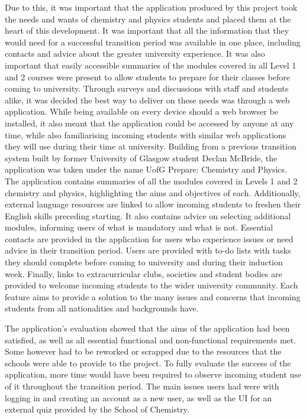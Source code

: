 \documentclass{l4proj}
\begin{document}
Due to this,  it was important that the application produced by this project took the needs and wants of chemistry and physics students and placed them at the heart of this development. It was important that all the information that they would need for a successful transition period was available in one place,  including contacts and advice about the greater university experience. It was also important that easily accessible summaries of the modules covered in all Level 1 and 2 courses were present to allow students to prepare for their classes before coming to university. Through surveys and discussions with staff and students alike,  it was decided the best way to deliver on these needs was through a web application. While being available on every device should a web browser be installed,  it also meant that the application could be accessed by anyone at any time,  while also familiarising incoming students with similar web applications they will use during their time at university. Building from a previous transition system built by former University of Glasgow student Declan McBride,  the application was taken under the name UofG Prepare: Chemistry and Physics. The application contains summaries of all the modules covered in Levels 1 and 2 chemistry and physics,  highlighting the aims and objectives of each. Additionally,  external language resources are linked to allow incoming students to freshen their English skills preceding starting. It also contains advice on selecting additional modules,  informing users of what is mandatory and what is not. Essential contacts are provided in the application for users who experience issues or need advice in their transition period. Users are provided with to-do lists with tasks they should complete before coming to university and during their induction week. Finally,  links to extracurricular clubs,  societies and student bodies are provided to welcome incoming students to the wider university community. Each feature aims to provide a solution to the many issues and concerns that incoming students from all nationalities and backgrounds have.

The application's evaluation showed that the aims of the application had been satisfied,  as well as all essential functional and non-functional requirements met. Some however had to be reworked or scrapped due to the resources that the schools were able to provide to the project. To fully evaluate the success of the application,  more time would have been required to observe incoming student use of it throughout the transition period. The main issues users had were with logging in and creating an account as a new user,  as well as the UI for an external quiz provided by the School of Chemistry.
\end{document}
